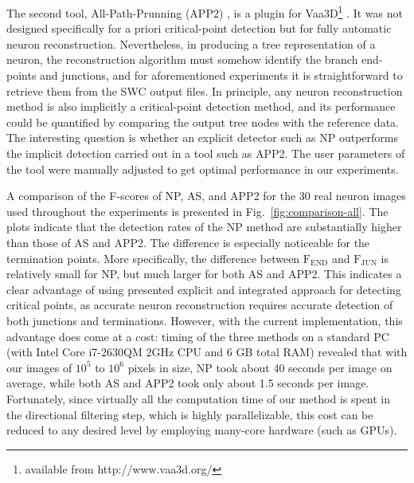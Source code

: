 The second tool, All-Path-Prunning (APP2) \cite{xiao2013app2}, is a plugin for Vaa3D\footnote{available from http://www.vaa3d.org/} \cite{peng2010v3d, peng2014extensible}. It was not designed specifically for a priori critical-point detection but for fully automatic neuron reconstruction. Nevertheless, in producing a tree representation of a neuron, the reconstruction algorithm must somehow identify the branch end-points and junctions, and for aforementioned experiments it is straightforward to retrieve them from the SWC output files. In principle, any neuron reconstruction method is also implicitly a critical-point detection method, and its performance could be quantified by comparing the output tree nodes with the reference data. The interesting question is whether an explicit detector such as NP outperforms the implicit detection carried out in a tool such as APP2. The user parameters of the tool were manually adjusted to get optimal performance in our experiments.

A comparison of the F-scores of NP, AS, and APP2 for the 30 real neuron images used throughout the experiments is presented in Fig.~\ref{fig:comparison-all}. The plots indicate that the detection rates of the NP method are substantially higher than those of AS and APP2. The difference is especially noticeable for the termination points. More specifically, the difference between $\textrm{F}_{\textrm{END}}$ and $\textrm{F}_{\textrm{JUN}}$ is relatively small for NP, but much larger for both AS and APP2. This indicates a clear advantage of using presented explicit and integrated approach for detecting critical points, as accurate neuron reconstruction requires accurate detection of both junctions and terminations. However, with the current implementation, this advantage does come at a cost: timing of the three methods on a standard PC (with Intel Core i7-2630QM 2GHz CPU and 6 GB total RAM) revealed that with our images of $10^5$ to $10^6$ pixels in size, NP took about 40 seconds per image on average, while both AS and APP2 took only about 1.5 seconds per image. Fortunately, since virtually all the computation time of our method is spent in the directional filtering step, which is highly parallelizable, this cost can be reduced to any desired level by employing many-core hardware (such as GPUs).

